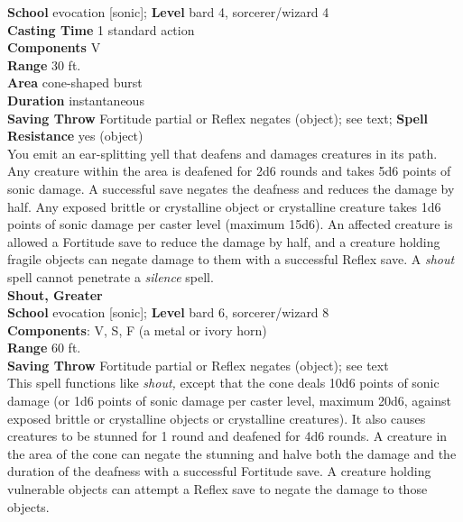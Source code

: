 \textbf{School} evocation [sonic]; \textbf{Level} bard 4, sorcerer/wizard 4\\
\textbf{Casting Time} 1 standard action\\
\textbf{Components} V\\
\textbf{Range} 30 ft.\\
\textbf{Area} cone-shaped burst\\
\textbf{Duration} instantaneous\\
\textbf{Saving Throw} Fortitude partial or Reflex negates (object); see text; \textbf{Spell Resistance} yes (object)\\
You emit an ear-splitting yell that deafens and damages creatures in its path. Any creature within the area is deafened for 2d6 rounds and takes 5d6 points of sonic damage. A successful save negates the deafness and reduces the damage by half. Any exposed brittle or crystalline object or crystalline creature takes 1d6 points of sonic damage per caster level (maximum 15d6). An affected creature is allowed a Fortitude save to reduce the damage by half, and a creature holding fragile objects can negate damage to them with a successful Reflex save. A \textit{shout }spell cannot penetrate a \textit{silence }spell.\\
\textbf{Shout, Greater}\\
\textbf{School} evocation [sonic]; \textbf{Level} bard 6, sorcerer/wizard 8\\
\textbf{Components}: V, S, F (a metal or ivory horn)\\
\textbf{Range} 60 ft.\\
\textbf{Saving Throw} Fortitude partial or Reflex negates (object); see text\\
This spell functions like \textit{shout, }except that the cone deals 10d6 points of sonic damage (or 1d6 points of sonic damage per caster level, maximum 20d6, against exposed brittle or crystalline objects or crystalline creatures). It also causes creatures to be stunned for 1 round and deafened for 4d6 rounds. A creature in the area of the cone can negate the stunning and halve both the damage and the duration of the deafness with a successful Fortitude save. A creature holding vulnerable objects can attempt a Reflex save to negate the damage to those objects.\\
